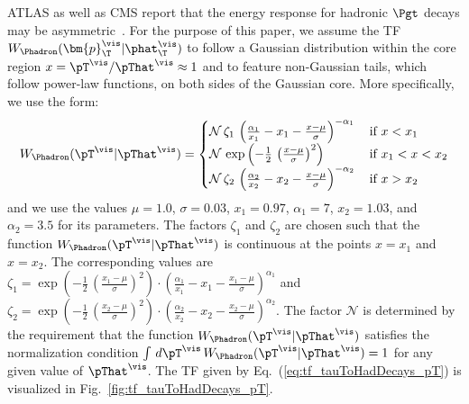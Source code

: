 ATLAS as well as CMS report that the energy response for hadronic
$\Pgt$ decays may be asymmetric~\cite{ATLAS:2011tfa,PRF-14-001}.
For the purpose of this paper, we assume the TF $W_{\Phadron}( \bm{p}_{\T}^{\vis} | \phat_{\T}^{\vis} )$ 
to follow a Gaussian distribution within the core region $x = \pT^{\vis}/\pThat^{\vis} \approx 1$ and to feature non-Gaussian tails,
which follow power-law functions, on both sides of the Gaussian core.
More specifically, we use the form:
\begin{equation}
W_{\Phadron}( \pT^{\vis} | \pThat^{\vis} ) = 
 \begin{cases}
   \mathcal{N} \, \zeta_{1} \, \left( \frac{\alpha_{1}}{x_{1}} - x_{1} - \frac{x - \mu}{\sigma} \right)^{-\alpha_{1}} \,  
 & \mbox{if } x < x_{1} \\
   \mathcal{N} \, \exp\left( -\frac{1}{2} \, \left( \frac{x - \mu}{\sigma} \right)^{2} \right) \,
 & \mbox{if } x_{1} < x < x_{2} \\
   \mathcal{N} \, \zeta_{2} \, \left( \frac{\alpha_{2}}{x_{2}} - x_{2} - \frac{x - \mu}{\sigma} \right)^{-\alpha_{2}} \,
 & \mbox{if } x > x_{2} 
 \end{cases}
\label{eq:tf_tauToHadDecays_pT}
\end{equation}
and we use the values $\mu = 1.0$, $\sigma = 0.03$, $x_{1} = 0.97$, $\alpha_{1} = 7$,
$x_{2} = 1.03$, and $\alpha_{2} = 3.5$ for its parameters.
The factors $\zeta_{1}$ and $\zeta_{2}$ are chosen such that the
function $W_{\Phadron}( \pT^{\vis} | \pThat^{\vis} )$ is continuous at
the points $x = x_{1}$ and $x = x_{2}$. 
The corresponding values are 
$\zeta_{1} = \exp\left( -\frac{1}{2} \, \left( \frac{x_{1} - \mu}{\sigma} \right)^{2} \right) \cdot \left( \frac{\alpha_{1}}{x_{1}} - x_{1} - \frac{x_{1} - \mu}{\sigma} \right)^{\alpha_{1}}$
and
$\zeta_{2} = \exp\left( -\frac{1}{2} \, \left( \frac{x_{2} - \mu}{\sigma} \right)^{2} \right) \cdot \left( \frac{\alpha_{2}}{x_{2}} - x_{2} - \frac{x_{2} - \mu}{\sigma} \right)^{\alpha_{2}}$.
The factor $\mathcal{N}$ is determined by the requirement that the function $W_{\Phadron}( \pT^{\vis} | \pThat^{\vis} )$ 
satisfies the normalization condition $\int \, d\pT^{\vis} \, W_{\Phadron}( \pT^{\vis} | \pThat^{\vis} ) = 1$ for any given value of $\pThat^{\vis}$.
The TF given by Eq.~(\ref{eq:tf_tauToHadDecays_pT}) is visualized in Fig.~\ref{fig:tf_tauToHadDecays_pT}.

